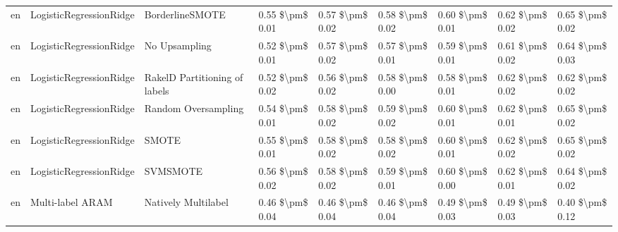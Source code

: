 \begin{tabular}{lllllllll}
      en &         LogisticRegressionRidge &               BorderlineSMOTE &     0.55 \$\textbackslash pm\$ 0.01 &           0.57 \$\textbackslash pm\$ 0.02 &       0.58 \$\textbackslash pm\$ 0.02 &        0.60 \$\textbackslash pm\$ 0.01 &                         0.62 \$\textbackslash pm\$ 0.02 &     0.65 \$\textbackslash pm\$ 0.02 \\
      en &         LogisticRegressionRidge &                 No Upsampling &     0.52 \$\textbackslash pm\$ 0.01 &           0.57 \$\textbackslash pm\$ 0.02 &       0.57 \$\textbackslash pm\$ 0.01 &        0.59 \$\textbackslash pm\$ 0.01 &                         0.61 \$\textbackslash pm\$ 0.02 &     0.64 \$\textbackslash pm\$ 0.03 \\
      en &         LogisticRegressionRidge & RakelD Partitioning of labels &     0.52 \$\textbackslash pm\$ 0.02 &           0.56 \$\textbackslash pm\$ 0.02 &       0.58 \$\textbackslash pm\$ 0.00 &        0.58 \$\textbackslash pm\$ 0.01 &                         0.62 \$\textbackslash pm\$ 0.02 &     0.62 \$\textbackslash pm\$ 0.02 \\
      en &         LogisticRegressionRidge &           Random Oversampling &     0.54 \$\textbackslash pm\$ 0.01 &           0.58 \$\textbackslash pm\$ 0.02 &       0.59 \$\textbackslash pm\$ 0.02 &        0.60 \$\textbackslash pm\$ 0.01 &                         0.62 \$\textbackslash pm\$ 0.01 &     0.65 \$\textbackslash pm\$ 0.02 \\
      en &         LogisticRegressionRidge &                         SMOTE &     0.55 \$\textbackslash pm\$ 0.01 &           0.58 \$\textbackslash pm\$ 0.02 &       0.58 \$\textbackslash pm\$ 0.02 &        0.60 \$\textbackslash pm\$ 0.01 &                         0.62 \$\textbackslash pm\$ 0.02 &     0.65 \$\textbackslash pm\$ 0.02 \\
      en &         LogisticRegressionRidge &                      SVMSMOTE &     0.56 \$\textbackslash pm\$ 0.02 &           0.58 \$\textbackslash pm\$ 0.02 &       0.59 \$\textbackslash pm\$ 0.01 &        0.60 \$\textbackslash pm\$ 0.00 &                         0.62 \$\textbackslash pm\$ 0.01 &     0.64 \$\textbackslash pm\$ 0.02 \\
      en &                Multi-label ARAM &           Natively Multilabel &     0.46 \$\textbackslash pm\$ 0.04 &           0.46 \$\textbackslash pm\$ 0.04 &       0.46 \$\textbackslash pm\$ 0.04 &        0.49 \$\textbackslash pm\$ 0.03 &                         0.49 \$\textbackslash pm\$ 0.03 &     0.40 \$\textbackslash pm\$ 0.12 \\

\end{tabular}

